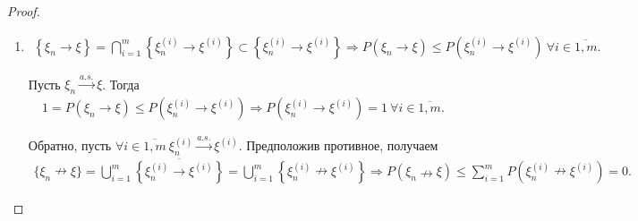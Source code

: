 \begin{proof} ~
	\begin{enumerate}
		\item 
		\begin{gather*}
		    \left\{\xi _{n}\rightarrow \xi \right\} = \bigcap _{i=1}^{m}\left\{\xi _{n}^{( i)}\rightarrow \xi ^{( i)}\right\} \subset \left\{\xi _{n}^{( i)}\rightarrow \xi ^{( i)}\right\} \Rightarrow P\left( \xi _{n}\rightarrow \xi \right) \leqslant P\left( \xi _{n}^{( i)}\rightarrow \xi ^{( i)}\right) \ \forall i\in \overline{1,m}.
		\end{gather*}
		
		Пусть $\displaystyle \xi_n \xrightarrow{a.s.} \xi$. Тогда
		\begin{gather*}
		    1=P\left( \xi _{n}\rightarrow \xi \right) \leqslant P\left( \xi _{n}^{( i)}\rightarrow \xi ^{( i)}\right) \Rightarrow P\left( \xi _{n}^{( i)}\rightarrow \xi ^{( i)}\right) =1\ \forall i\in \overline{1,m}.
		\end{gather*}
		
		Обратно, пусть $\forall i\in \overline{1,m} \ \xi _{n}^{( i)}\xrightarrow{a.s.} \xi ^{( i)}$. Предположив противное, получаем
		\begin{gather*}
		    \{\xi _{n} \nrightarrow \xi \} = \bigcup _{i=1}^{m}\overline{\left\{\xi _{n}^{(i)}\rightarrow \xi ^{(i)}\right\}} =\bigcup _{i=1}^{m}\left\{\xi _{n}^{(i)} \nrightarrow \xi ^{(i)}\right\} \Rightarrow P( \xi _{n} \nrightarrow \xi ) \leqslant \sum _{i=1}^{m} P\left( \xi _{n}^{(i)} \nrightarrow \xi ^{(i)}\right) = 0.
		\end{gather*}
		

\end{enumerate}
\end{proof}
